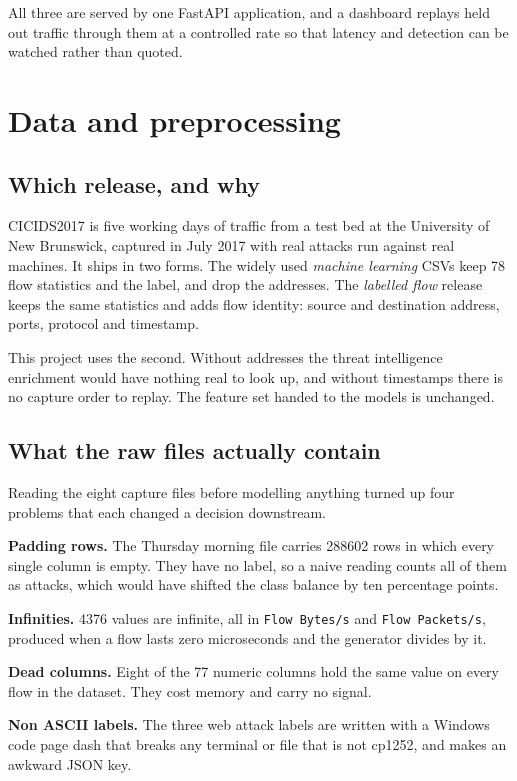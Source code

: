 \documentclass[9pt,a4paper,twocolumn]{article}
\begin{document}
All three are served by one FastAPI application, and a dashboard replays held
out traffic through them at a controlled rate so that latency and detection can
be watched rather than quoted.

\section{Data and preprocessing}

\subsection{Which release, and why}

CICIDS2017 is five working days of traffic from a test bed at the University of
New Brunswick, captured in July 2017 with real attacks run against real
machines. It ships in two forms. The widely used \emph{machine learning} CSVs
keep 78 flow statistics and the label, and drop the addresses. The
\emph{labelled flow} release keeps the same statistics and adds flow identity:
source and destination address, ports, protocol and timestamp.

This project uses the second. Without addresses the threat intelligence
enrichment would have nothing real to look up, and without timestamps there is
no capture order to replay. The feature set handed to the models is unchanged.

\subsection{What the raw files actually contain}

Reading the eight capture files before modelling anything turned up four
problems that each changed a decision downstream.

\textbf{Padding rows.} The Thursday morning file carries
\num{288602} rows in which every single column is empty. They have no label, so
a naive reading counts all of them as attacks, which would have shifted the
class balance by ten percentage points.

\textbf{Infinities.} \num{4376} values are infinite, all in
\texttt{Flow Bytes/s} and \texttt{Flow Packets/s}, produced when a flow lasts
zero microseconds and the generator divides by it.

\textbf{Dead columns.} Eight of the 77 numeric columns hold the same value on
every flow in the dataset. They cost memory and carry no signal.

\textbf{Non ASCII labels.} The three web attack labels are written with a
Windows code page dash that breaks any terminal or file that is not cp1252, and
makes an awkward JSON key.
\end{document}
